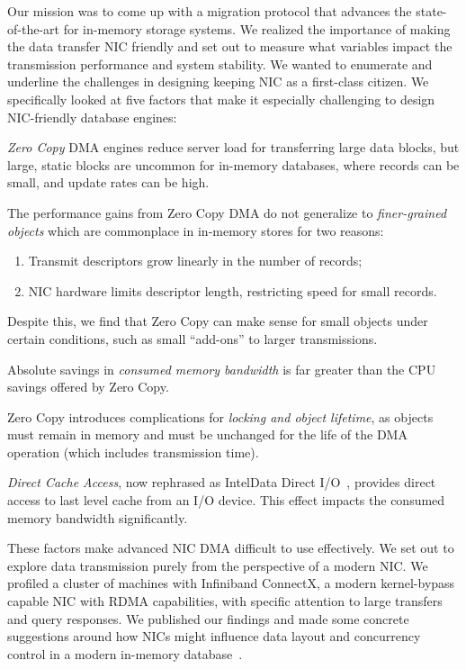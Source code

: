 Our mission was to come up with a migration protocol that advances the state-of-the-art for in-memory storage systems.
We realized the importance of making the data transfer NIC friendly and set out to measure what variables impact the 
transmission performance and system stability. We wanted to enumerate and underline the challenges in designing keeping NIC as a first-class citizen.
We specifically looked at five factors that make it especially challenging to design NIC-friendly
database engines:
\begin{myitemize}
  \item {\em Zero Copy} DMA engines reduce server load for transferring large data
    blocks, but large, static blocks are uncommon for in-memory databases,
    where records can be small, and update rates can be high.
  \item The performance gains from Zero Copy DMA do not generalize to
      {\em finer-grained objects} which are commonplace in in-memory stores for two reasons:
      \begin{enumerate}
        \item Transmit descriptors grow linearly in the number of records;
        \item NIC hardware limits descriptor length, restricting speed for small records.
      \end{enumerate}
      Despite this, we find that Zero Copy can make sense for small objects under certain conditions, such as
      small ``add-ons'' to larger transmissions.
   \item Absolute savings in {\em consumed memory bandwidth} is far greater than the CPU savings 
       offered by Zero Copy.
   \item Zero Copy introduces complications for \emph{locking and object
      lifetime}, as objects must remain in memory and must be
      unchanged for the life of the DMA operation (which includes transmission
      time).
  \item {\em Direct Cache Access}, now rephrased as Intel\textregistered Data Direct I/O~\cite{ddio},
      provides direct access to last level cache from an I/O device. This effect
      impacts the consumed memory bandwidth significantly.
\end{myitemize}


These factors make advanced NIC DMA difficult to use effectively. We set out to explore data 
transmission purely from the perspective of a modern NIC. We profiled a cluster of machines with
Infiniband ConnectX, a modern kernel-bypass capable NIC
with RDMA capabilities, with specific attention to large transfers and query responses.
We published our findings and made some concrete suggestions around how NICs might
influence data layout and concurrency control in a modern in-memory 
database~\cite{imdmpaper}. 

